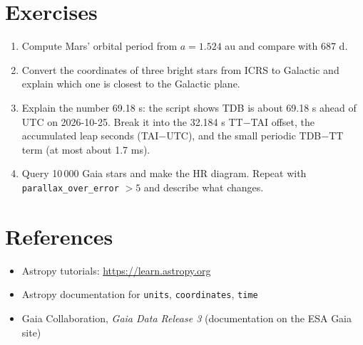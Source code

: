 \section{Exercises}
\begin{enumerate}
\item Compute Mars' orbital period from $a=1.524$ au and compare with 687 d.
\item Convert the coordinates of three bright stars from ICRS to Galactic and explain which one is closest to the Galactic plane.
\item Explain the number 69.18 s: the script shows TDB is about 69.18 s ahead of UTC on 2026-10-25. Break it into the 32.184 s TT$-$TAI offset, the accumulated leap seconds (TAI$-$UTC), and the small periodic TDB$-$TT term (at most about 1.7 ms).
\item Query 10\,000 Gaia stars and make the HR diagram. Repeat with \texttt{parallax\_over\_error} $>5$ and describe what changes.
\end{enumerate}

\section*{References}
\begin{itemize}
\item Astropy tutorials: \url{https://learn.astropy.org}
\item Astropy documentation for \texttt{units}, \texttt{coordinates}, \texttt{time}
\item Gaia Collaboration, \textit{Gaia Data Release 3} (documentation on the ESA Gaia site)
\end{itemize}

